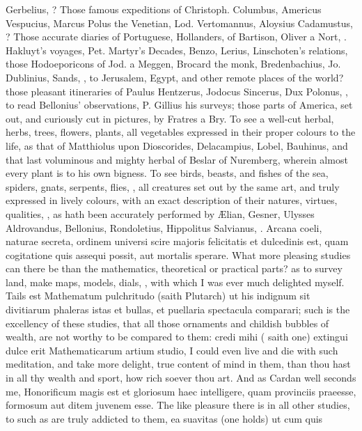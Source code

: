 {Gerbelius, \etc{}? Those famous expeditions of Christoph. Columbus,
Americus Vespucius, Marcus Polus the Venetian, Lod. Vertomannus,
Aloysius Cadamustus, \etc{}? Those accurate diaries of Portuguese,
Hollanders, of Bartison, Oliver a Nort, \etc{}. Hakluyt's voyages, Pet.
Martyr's Decades, Benzo, Lerius, Linschoten's relations, those
Hodoeporicons of Jod. a Meggen, Brocard the monk, Bredenbachius, Jo.
Dublinius, Sands, \etc{}, to Jerusalem, Egypt, and other remote places of
the world? those pleasant itineraries of Paulus Hentzerus, Jodocus
Sincerus, Dux Polonus, \etc{}, to read Bellonius' observations, P. Gillius
his surveys; those parts of America, set out, and curiously cut in
pictures, by Fratres a Bry. To see a well-cut herbal, herbs, trees,
flowers, plants, all vegetables expressed in their proper colours to
the life, as that of Matthiolus upon Dioscorides, Delacampius, Lobel,
Bauhinus, and that last voluminous and mighty herbal of Beslar of
Nuremberg, wherein almost every plant is to his own bigness. To see
birds, beasts, and fishes of the sea, spiders, gnats, serpents, flies,
\etc{}, all creatures set out by the same art, and truly expressed in
lively colours, with an exact description of their natures, virtues,
qualities, \etc{}, as hath been accurately performed by \AE{}lian, Gesner,
Ulysses Aldrovandus, Bellonius, Rondoletius, Hippolitus Salvianus, \etc{}.
Arcana coeli, naturae secreta, ordinem universi scire majoris
felicitatis et dulcedinis est, quam cogitatione quis assequi possit,
aut mortalis sperare. What more pleasing studies can there be than the
mathematics, theoretical or practical parts? as to survey land, make
maps, models, dials, \etc{}, with which I was ever much delighted myself.
Tails est Mathematum pulchritudo (saith  Plutarch) ut his
indignum sit divitiarum phaleras istas et bullas, et puellaria
spectacula comparari; such is the excellency of these studies, that all
those ornaments and childish bubbles of wealth, are not worthy to be
compared to them: credi mihi ( saith one) extingui dulce erit
Mathematicarum artium studio, I could even live and die with such
meditation, and take more delight, true content of mind in them,
than thou hast in all thy wealth and sport, how rich soever thou art.
And as Cardan well seconds me, Honorificum magis est et gloriosum
haec intelligere, quam provinciis praeesse, formosum aut ditem juvenem
esse. The like pleasure there is in all other studies, to such as
are truly addicted to them, ea suavitas (one holds) ut cum quis
}
